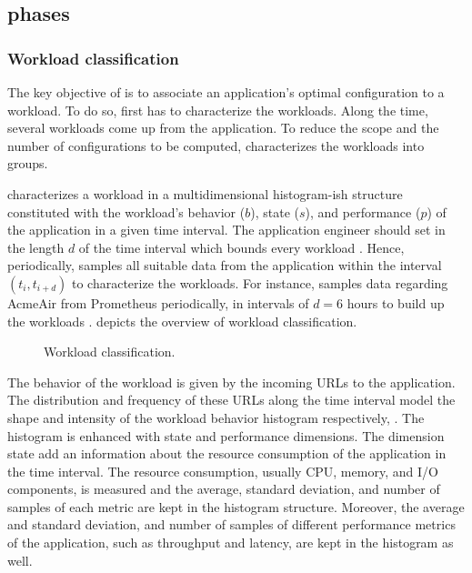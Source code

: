 \subsection{\name phases}


\subsubsection{Workload classification}

The key objective of \name is to associate an application's optimal
configuration to a workload. To do so, first \name has to characterize the
workloads. Along the time, several workloads come up from the
application. To reduce the scope and the number of configurations to be
computed, \name characterizes the workloads into groups.

\name characterizes a workload in a multidimensional histogram-ish structure
constituted with the workload's behavior ($b$), state ($s$), and performance
($p$) of the application in a given time interval. The application engineer
should set in \name the length $d$ of the time interval which bounds every
workload . Hence, periodically, \name samples all suitable data from the
application within the interval $(t_i, t_{i+d})$ to characterize the workloads.
For instance, \name samples data regarding AcmeAir from Prometheus periodically,
in intervals of $d = 6$ hours to build up the workloads .
 depicts the overview of workload
classification.

\begin{figure*}[htp]
    \centering
    \def\svgwidth{\textwidth}
    \scalebox{1.0}{}
    \caption{Workload classification.}
    \label{fig:workload-classification}
\end{figure*}

The behavior of the workload is given by the incoming URLs to the application.
The distribution and frequency of these URLs along the time interval model the
shape and intensity of the workload behavior histogram respectively,
.  The histogram is enhanced with state and performance
dimensions. The dimension state add an information about the resource
consumption of the application in the time interval. The resource consumption,
usually CPU, memory, and I/O components, is measured and the average, standard
deviation, and number of samples of each metric are kept in the histogram
structure.  Moreover, the average and standard deviation, and number of samples
of different performance metrics of the application, such as throughput and
latency, are kept in the histogram as well.

